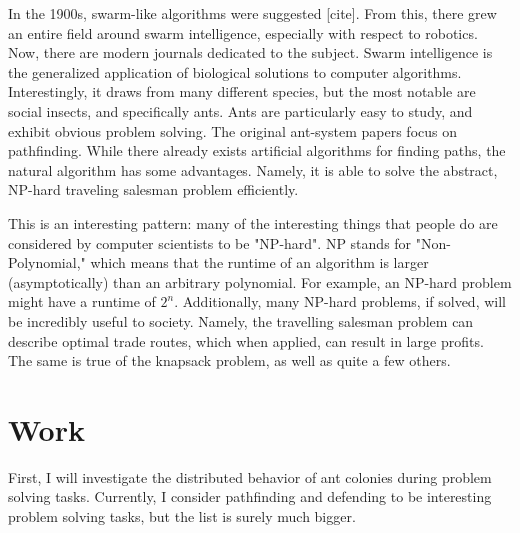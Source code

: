 \documentclass{nature}
\begin{document}
    In the 1900s, swarm-like algorithms were suggested [cite].
    From this, there grew an entire field around swarm intelligence, especially with respect to robotics.
    Now, there are modern journals dedicated to the subject.
    Swarm intelligence is the generalized application of biological solutions to computer algorithms.
    Interestingly, it draws from many different species, but the most notable are social insects, and specifically ants.
    Ants are particularly easy to study, and exhibit obvious problem solving.
    The original ant-system papers focus on pathfinding.
    While there already exists artificial algorithms for finding paths, the natural algorithm has some advantages.
    Namely, it is able to solve the abstract, NP-hard traveling salesman problem efficiently. 

    This is an interesting pattern: many of the interesting things that people do are considered by computer scientists to be "NP-hard".
    NP stands for "Non-Polynomial," which means that the runtime of an algorithm is larger (asymptotically) than an arbitrary polynomial.
    For example, an NP-hard problem might have a runtime of $2^n$. 
    Additionally, many NP-hard problems, if solved, will be incredibly useful to society.
    Namely, the travelling salesman problem can describe optimal trade routes, which when applied, can result in large profits.
    The same is true of the knapsack problem, as well as quite a few others.



\section{Work}

    First, I will investigate the distributed behavior of ant colonies during problem solving tasks.
    Currently, I consider pathfinding and defending to be interesting problem solving tasks, but the list is surely much bigger.
\end{document}
